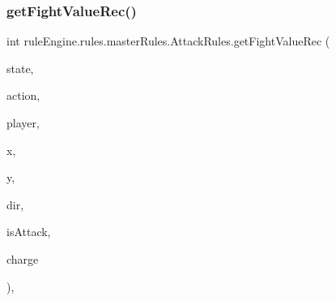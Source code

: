 \mbox{\label{classrule_engine_1_1rules_1_1master_rules_1_1_attack_rules_ab245cc7a1359f4049b2434184bc44076}} 
\subsubsection{\texorpdfstring{get\+Fight\+Value\+Rec()}{getFightValueRec()}}
{\footnotesize\ttfamily int rule\+Engine.\+rules.\+master\+Rules.\+Attack\+Rules.\+get\+Fight\+Value\+Rec (\begin{DoxyParamCaption}\item[{\mbox{\hyperlink{classgame_1_1game_state_1_1_game_state}{Game\+State}}}]{state,  }\item[{\mbox{\hyperlink{classrule_engine_1_1_game_action}{Game\+Action}}}]{action,  }\item[{\mbox{\hyperlink{enumgame_1_1_e_player}{E\+Player}}}]{player,  }\item[{int}]{x,  }\item[{int}]{y,  }\item[{\mbox{\hyperlink{enumgame_1_1board_1_1_e_direction}{E\+Direction}}}]{dir,  }\item[{boolean}]{is\+Attack,  }\item[{boolean}]{charge }\end{DoxyParamCaption})\hspace{0.3cm}{\ttfamily [inline]}, {\ttfamily [private]}}

